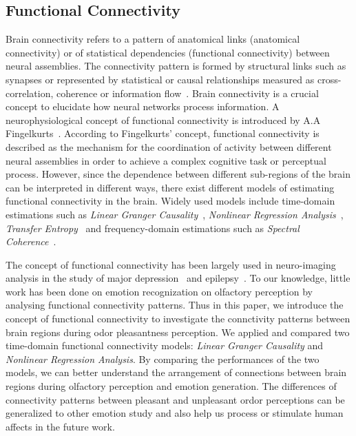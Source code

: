 \subsection{Functional Connectivity}
Brain connectivity refers to a pattern of anatomical links (anatomical connectivity) or of statistical dependencies (functional connectivity) between neural assemblies. The connectivity pattern is formed by structural links such as synapses or represented by statistical or causal relationships measured as cross-correlation, coherence or information flow~\cite{sporns2007brain}. Brain connectivity is a crucial concept to elucidate how neural networks process information. 
A neurophysiological concept of functional connectivity is introduced by A.A Fingelkurts~\cite{fingelkurts2005functional}. According to Fingelkurts' concept, functional connectivity is described as the mechanism for the coordination of activity between different neural assemblies in order to achieve a complex cognitive task or perceptual process. However, since the dependence between different sub-regions of the brain can be interpreted in different ways, there exist different models of estimating functional connectivity in the brain. Widely used models include time-domain estimations such as \emph{Linear Granger Causality}~\cite{granger1969investigating}, \emph{Nonlinear Regression Analysis}~\cite{pijn1990localization}, \emph{Transfer Entropy}~\cite{schreiber2000measuring} and frequency-domain estimations such as \emph{Spectral Coherence}~\cite{sun2004measuring}.

The concept of functional connectivity has been largely used in neuro-imaging analysis in the study of major depression~\cite{greicius2007resting} and epilepsy~\cite{waites2006functional}. To our knowledge, little work has been done on emotion recognization on olfactory perception by analysing functional connectivity patterns. Thus in this paper, we introduce the concept of functional connectivity to investigate the connctivity patterns between brain regions during odor pleasantness perception. We applied and compared two time-domain functional connectivity models: \emph{Linear Granger Causality} and \emph{Nonlinear Regression Analysis}. By comparing the performances of the two models, we can better understand the arrangement of connections between brain regions during olfactory perception and emotion generation. The differences of connectivity patterns between pleasant and unpleasant ordor perceptions can be generalized to other emotion study and also help us process or stimulate human affects in the future work. 

